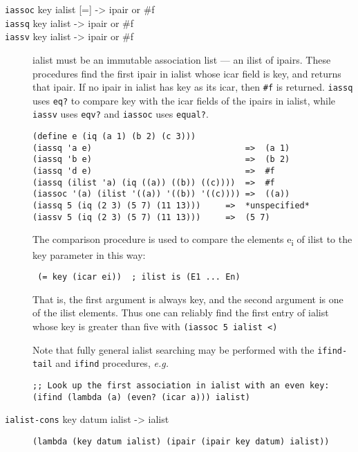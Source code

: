 \begin{description}
\item[ \href{}{} \texttt{iassoc} key ialist {[}={]} -\textgreater{}
ipair or \#f\\
\href{}{} \texttt{iassq} key ialist -\textgreater{} ipair or \#f\\
\href{}{} \texttt{iassv} key ialist -\textgreater{} ipair or \#f ]
ialist must be an immutable association list --- an ilist of ipairs.
These procedures find the first ipair in ialist whose icar field is key,
and returns that ipair. If no ipair in ialist has key as its icar, then
\texttt{\#f} is returned. \texttt{iassq} uses \texttt{eq?} to compare
key with the icar fields of the ipairs in ialist, while \texttt{iassv}
uses \texttt{eqv?} and \texttt{iassoc} uses \texttt{equal?}.

\begin{verbatim}
(define e (iq (a 1) (b 2) (c 3)))
(iassq 'a e)                               =>  (a 1)
(iassq 'b e)                               =>  (b 2)
(iassq 'd e)                               =>  #f
(iassq (ilist 'a) (iq ((a)) ((b)) ((c))))  =>  #f
(iassoc '(a) (ilist '((a)) '((b)) '((c)))) =>  ((a))
(iassq 5 (iq (2 3) (5 7) (11 13)))     =>  *unspecified*
(iassv 5 (iq (2 3) (5 7) (11 13)))     =>  (5 7)
\end{verbatim}

The comparison procedure is used to compare the elements
e\textsubscript{i} of ilist to the key parameter in this way:

\texttt{\ (=\ key\ (icar\ ei))\ \ ;\ ilist\ is\ (E1\ ...\ En)}

That is, the first argument is always key, and the second argument is
one of the ilist elements. Thus one can reliably find the first entry of
ialist whose key is greater than five with
\texttt{(iassoc\ 5\ ialist\ \textless{})}

Note that fully general ialist searching may be performed with the
\texttt{ifind-tail} and \texttt{ifind} procedures, \emph{e.g.}

\begin{verbatim}
;; Look up the first association in ialist with an even key:
(ifind (lambda (a) (even? (icar a))) ialist)
\end{verbatim}
\item[ \href{}{} \texttt{ialist-cons} key datum ialist -\textgreater{}
ialist ]
\begin{verbatim}
(lambda (key datum ialist) (ipair (ipair key datum) ialist))
\end{verbatim}


\end{description}
